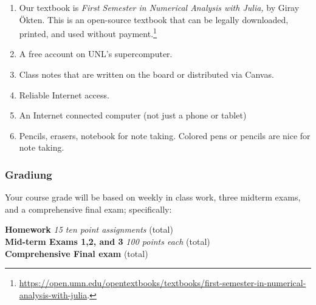\documentclass[12pt,fullpage]{article}
\newcounter{ex}\setcounter{ex}{0}
\newenvironment{mypar}[2]
  {\begin{list}{}%
    {\setlength\leftmargin{#1}
    \setlength\rightmargin{#2}}
    \item[]}
  {\end{list}}
\begin{document}
\begin{enumerate}

\item Our textbook is \emph{First Semester in Numerical Analysis with Julia,} by Giray Ökten.  This is an open-source 
textbook that can be legally downloaded, printed, and  used without 
payment.\footnote{\tiny \url{https://open.umn.edu/opentextbooks/textbooks/first-semester-in-numerical-analysis-with-julia}.  \normalsize} 

\item A free account on UNL's supercomputer.

\item Class notes that are written on the board or distributed via Canvas.

\item Reliable Internet access.

\item  An Internet connected computer (not just a phone or tablet) 

\item Pencils, erasers, notebook for note taking. Colored pens or pencils are nice 
for note taking.


 \end{enumerate}


\subsubsection*{Gradiung}
 Your course grade will be based on weekly in class work, three midterm exams, and a 
 comprehensive 
 final exam; specifically:
 \begin{mypar}{0.25in}{0.25in}
       \textbf{Homework}  \emph{15 ten point assignments}   (total) \\
       \textbf{Mid-term Exams 1,2, and 3} \emph{100 points each}  (total)\\
          \textbf{Comprehensive Final exam}  (total)
 \end{mypar}

 
 
 
 
 
\end{document}
